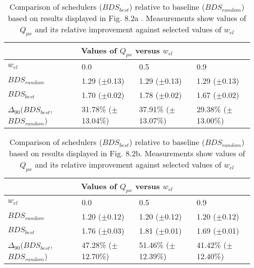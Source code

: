 \clearpage
\begin{landscape}
\begin{table}[h]
\begin{center}
\begin{tabular}{llll}
\toprule
\multicolumn{4}{c}{Values of $Q_{px}$ versus $w_{el}$}\\
\midrule
$w_{el}$ & 0.0 & 0.5 & 0.9\\
\midrule
$BDS_{random}$ &  1.29 ($\pm$0.13) &  1.29 ($\pm$0.13) &  1.29 ($\pm$0.13)\\
\midrule
$BDS_{best}$ &  1.70 ($\pm$0.02) &  1.78 ($\pm$0.02) &  1.67 ($\pm$0.02)\\
$\Delta_{90}$($BDS_{best}$,$BDS_{random}$) & 31.78\% ($\pm$13.04\%) & 37.91\% ($\pm$13.07\%) & 29.38\% ($\pm$13.00\%)\\
\bottomrule
\end{tabular}
\end{center}
\caption[Comparison of $Q_{px}$ versus $w_{el}$ for $BDS_{best}$ relative to $BDS_{random}$.]{Comparison of schedulers ($BDS_{best}$) relative to baseline ($BDS_{random}$) based on results displayed in Fig. 8.2a . Measurements show values of $Q_{px}$ and its relative improvement against selected values of $w_{el}$}
\label{b:f82a}
\end{table}
\end{landscape}


\clearpage
\begin{landscape}
\begin{table}[h]
\begin{center}
\begin{tabular}{llll}
\toprule
\multicolumn{4}{c}{Values of $Q_{px}$ versus $w_{el}$}\\
\midrule
$w_{el}$ & 0.0 & 0.5 & 0.9\\
\midrule
$BDS_{random}$ &  1.20 ($\pm$0.12) &  1.20 ($\pm$0.12) &  1.20 ($\pm$0.12)\\
\midrule
$BDS_{best}$ &  1.76 ($\pm$0.03) &  1.81 ($\pm$0.01) &  1.69 ($\pm$0.01)\\
$\Delta_{90}$($BDS_{best}$,$BDS_{random}$) & 47.28\% ($\pm$12.70\%) & 51.46\% ($\pm$12.39\%) & 41.42\% ($\pm$12.40\%)\\
\bottomrule
\end{tabular}
\end{center}
\caption[Comparison of $Q_{px}$ versus $w_{el}$ for $BDS_{best}$ relative to $BDS_{random}$.]{Comparison of schedulers ($BDS_{best}$) relative to baseline ($BDS_{random}$) based on results displayed in Fig. 8.2b. Measurements show values of $Q_{px}$ and its relative improvement against selected values of $w_{el}$}
\label{b:f82b}
\end{table}
\end{landscape}


